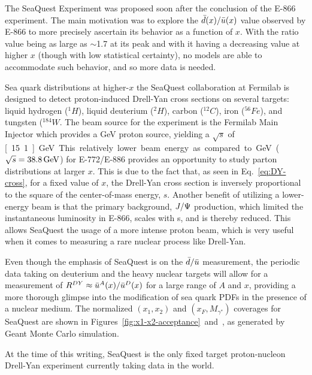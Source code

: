 The SeaQuest Experiment was proposed soon after the conclusion of the E-866 experiment. The main motivation was to explore the $\bar{d}(x)/\bar{u}(x)$ value observed by E-866 to more precisely ascertain its behavior as a function of $x$. With the ratio value being as large as $\sim$1.7 at its peak and with it having a decreasing value at higher $x$ (though with low statistical certainty), no models are able to accommodate such behavior, and so more data is needed. 

Sea quark distributions at higher-$x$ the SeaQuest collaboration at Fermilab is designed to detect proton-induced Drell-Yan cross sections on several targets: liquid hydrogen ($^1H$), liquid deuterium ($^2H$), carbon ($^{12}C$), iron ($^{56}Fe$), and tungsten ($^{184}W$. The beam source for the experiment is the Fermilab Main Injector which provides a \unit[120]{GeV} proton source, yielding a $\sqrt{s}$ of \unit[15.1]{GeV}. This relatively lower beam energy as compared to \unit[800]{GeV} ($\sqrt{s}=\unit[38.8]{GeV}$) for E-772/E-886 provides an opportunity to study parton distributions at larger $x$. This is due to the fact that, as seen in Eq.~\ref{eq:DY-cross}, for a fixed value of $x$, the Drell-Yan cross section is inversely proportional to the square of the center-of-mass energy, $s$. Another benefit of utilizing a lower-energy beam is that the primary background, $J/\Psi$ production, which limited the instantaneous luminosity in E-866, scales with s, and is thereby reduced. This allows SeaQuest the usage of a more intense proton beam, which is very useful when it comes to measuring a rare nuclear process like Drell-Yan.

Even though the emphasis of SeaQuest is on the $\bar{d}/\bar{u}$ measurement, the periodic data taking on deuterium and the heavy nuclear targets will allow for a measurement of $R^{DY}\approx\bar{u}^A(x)/\bar{u}^D(x)$ for a large range of $A$ and $x$, providing a more thorough glimpse into the modification of sea quark PDFs in the presence of a nuclear medium. The normalized $(x_1, x_2)$ and $(x_F, M_{\gamma^*})$ coverages for SeaQuest are shown in Figures~\ref{fig:x1-x2-acceptance}~and~, as generated by Geant Monte Carlo simulation.

At the time of this writing, SeaQuest is the only fixed target proton-nucleon Drell-Yan experiment currently taking data in the world.

